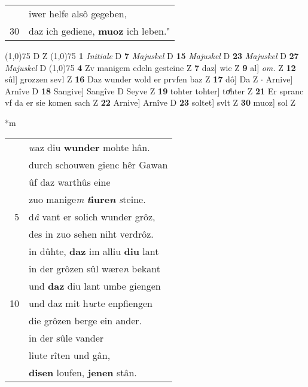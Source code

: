 \documentclass[8pt,a4paper,notitlepage]{article}
\begin{document}
\begin{table}[ht]
\begin{minipage}[t]{0.5\linewidth}
\begin{tabular}{rl}
 & iwer helfe alsô gegeben,\\ 
30 & daz ich gediene, \textbf{muoz} ich leben."\\ 
\end{tabular}
\scriptsize
\line(1,0){75} \newline
D Z \newline
\line(1,0){75} \newline
\textbf{1} \textit{Initiale} D  \textbf{7} \textit{Majuskel} D  \textbf{15} \textit{Majuskel} D  \textbf{23} \textit{Majuskel} D  \textbf{27} \textit{Majuskel} D  \newline
\line(1,0){75} \newline
\textbf{4} Zv manigem edeln gesteine Z \textbf{7} daz] wie Z \textbf{9} al] \textit{om.} Z \textbf{12} sûl] grozzen sevl Z \textbf{16} Daz wunder wold er prvfen baz Z \textbf{17} dô] Da Z  $\cdot$ Arnive] Arnîve D \textbf{18} Sangive] Sangîve D Seyve Z \textbf{19} tohter tohter] toͤhter Z \textbf{21} Er spranc vf da er sie komen sach Z \textbf{22} Arnive] Arnîve D \textbf{23} soltet] svlt Z \textbf{30} muoz] sol Z \newline
\end{minipage}
\hspace{0.5cm}
\begin{minipage}[t]{0.5\linewidth}
\small
\begin{center}*m
\end{center}
\begin{tabular}{rl}
 & \textit{w}az diu \textbf{wunder} mohte hân.\\ 
 & durch schouwen gienc hêr Gawan\\ 
 & ûf daz warthûs eine\\ 
 & zuo manige\textit{m} \textbf{\textit{t}iure\textit{n}} \textit{s}teine.\\ 
5 & d\textit{â} vant er solich wunder grôz,\\ 
 & des in zuo sehen niht verdrôz.\\ 
 & in dûhte, \textbf{daz} im alliu \textbf{diu} lant\\ 
 & in der grôzen sûl wære\textit{n} bekant\\ 
 & und \textbf{daz} diu lant umbe giengen\\ 
10 & und daz mit h\textit{u}rte enpfiengen\\ 
 & die grôzen berge ein ander.\\ 
 & in der sûle vander\\ 
 & liute rîten und gân,\\ 
 & \textbf{disen} loufen, \textbf{jenen} stân.\\ 

\end{tabular}
\end{minipage}
\end{table}
\end{document}
